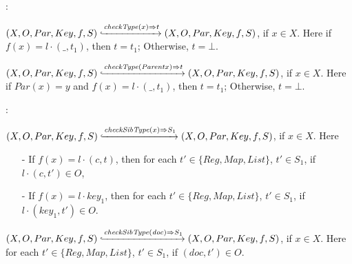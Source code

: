 :

$(X,O,Par,Key,f,S) \xhookrightarrow{ \mathit{checkType}(x)\Rightarrow t } (X, O, Par, Key, f, S)$, if $x \in X$. Here if $f(x) = l \cdot (\_,t_1)$, then $t = t_1$; Otherwise, $t = \bot$.

$(X,O,Par,Key,f,S) \xhookrightarrow{ \mathit{checkType}(\mathit{Parent}x)\Rightarrow t } (X, O, Par, Key, f, S)$, if $x \in X$. Here if $Par(x) = y$ and $f(x) = l \cdot (\_,t_1)$, then $t = t_1$; Otherwise, $t = \bot$.


:

$(X,O,Par,Key,f,S) \xhookrightarrow{ \mathit{checkSibType}(x)\Rightarrow S_1 } (X, O, Par, Key, f, S)$, if $x \in X$. Here

\begin{itemize}
\setlength{\itemsep}{0.5pt}
\item[-] If $f(x) = l \cdot (c,t)$, then for each $t' \in \{ \mathit{Reg}, \mathit{Map}, \mathit{List} \}$, $t' \in S_1$, if $l \cdot (c,t') \in O$,

\item[-] If $f(x) = l \cdot \mathit{key}_1$, then for each $t' \in \{ \mathit{Reg}, \mathit{Map}, \mathit{List} \}$, $t' \in S_1$, if $l \cdot (\mathit{key}_1,t') \in O$.
\end{itemize}

$(X,O,Par,Key,f,S) \xhookrightarrow{ \mathit{checkSibType}(\mathit{doc})\Rightarrow S_1 } (X, O, Par, Key, f, S)$, if $x \in X$. Here for each $t' \in \{ \mathit{Reg}, \mathit{Map}, \mathit{List} \}$, $t' \in S_1$, if $(\mathit{doc},t') \in O$.










